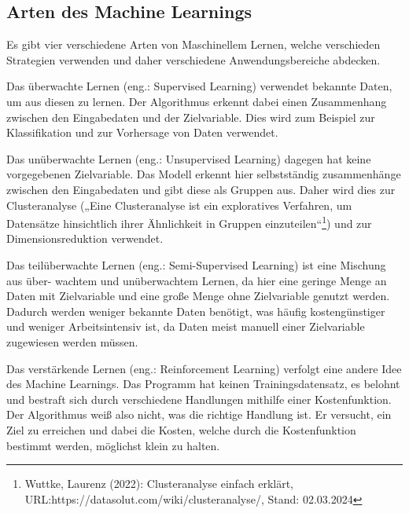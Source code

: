 \documentclass[11pt,oneside]{report}
\begin{document}
\subsection{Arten des Machine Learnings}
Es gibt vier verschiedene Arten von Maschinellem Lernen, welche verschieden Strategien verwenden und daher verschiedene Anwendungsbereiche abdecken.

Das überwachte Lernen (eng.: Supervised Learning) verwendet bekannte Daten, um aus diesen zu lernen. Der Algorithmus erkennt dabei einen Zusammenhang zwischen den Eingabedaten und der Zielvariable. Dies wird zum Beispiel zur Klassifikation und zur Vorhersage von Daten verwendet.

Das unüberwachte Lernen (eng.: Unsupervised Learning) dagegen hat keine vorgegebenen Zielvariable. Das Modell erkennt hier selbstständig zusammenhänge zwischen den Eingabedaten und gibt diese als Gruppen aus. Daher wird dies zur Clusteranalyse („Eine Clusteranalyse ist ein exploratives Verfahren, um Datensätze hinsichtlich ihrer Ähnlichkeit in Gruppen einzuteilen“\footnote{Wuttke, Laurenz (2022): Clusteranalyse einfach erklärt, URL:https://datasolut.com/wiki/clusteranalyse/, Stand: 02.03.2024}) und zur Dimensionsreduktion verwendet.

Das teilüberwachte Lernen (eng.: Semi-Supervised Learning) ist eine Mischung aus über- wachtem und unüberwachtem Lernen, da hier eine geringe Menge an Daten mit Zielvariable und eine große Menge ohne Zielvariable genutzt werden. Dadurch werden weniger bekannte Daten benötigt, was häufig kostengünstiger und weniger Arbeitsintensiv ist, da Daten meist manuell einer Zielvariable zugewiesen werden müssen.

Das verstärkende Lernen (eng.: Reinforcement Learning) verfolgt eine andere Idee des Machine Learnings. Das Programm hat keinen Trainingsdatensatz, es belohnt und bestraft sich durch verschiedene Handlungen mithilfe einer Kostenfunktion. Der Algorithmus weiß also nicht, was die richtige Handlung ist. Er versucht, ein Ziel zu erreichen und dabei die Kosten, welche durch die Kostenfunktion bestimmt werden, möglichst klein zu halten.
\end{document}

